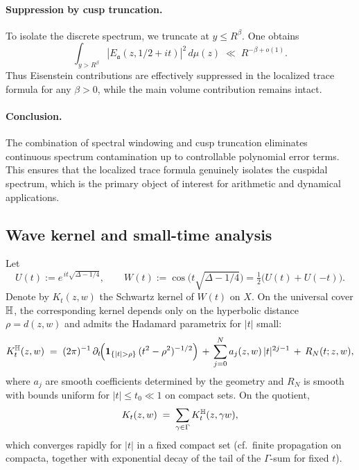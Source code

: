\paragraph{Suppression by cusp truncation.}
To isolate the discrete spectrum, we truncate at $y \leq R^\beta$.  
One obtains
\[
  \int_{y>R^\beta} |E_\mathfrak{a}(z,1/2+it)|^2 \, d\mu(z) \;\ll\; R^{-\beta+o(1)}.
\]
Thus Eisenstein contributions are effectively suppressed in the localized trace formula 
for any $\beta>0$, while the main volume contribution remains intact.  

\paragraph{Conclusion.}
The combination of spectral windowing and cusp truncation eliminates continuous spectrum 
contamination up to controllable polynomial error terms.  
This ensures that the localized trace formula genuinely isolates the cuspidal spectrum, 
which is the primary object of interest for arithmetic and dynamical applications.

\subsection{Wave kernel and small-time analysis}\label{subsec:wave}

Let
\begin{equation}\label{eq:wave-def}
  U(t) := e^{\,it\sqrt{\Delta-1/4}}, 
  \qquad 
  W(t) := \cos\!\big(t\sqrt{\Delta-1/4}\big) = \tfrac12\big(U(t)+U(-t)\big).
\end{equation}
Denote by $K_t(z,w)$ the Schwartz kernel of $W(t)$ on $X$. On the universal cover $\mathbb{H}$,
the corresponding kernel depends only on the hyperbolic distance $\rho=d(z,w)$ and admits
the Hadamard parametrix for $|t|$ small:
\begin{equation}\label{eq:hadamard}
  K_t^{\HH}(z,w) \;=\; (2\pi)^{-1}\,\partial_t\!\Big( \mathbf{1}_{\{|t|>\rho\}}\,(t^2-\rho^2)^{-1/2} \Big)
  \,+\, \sum_{j=0}^{N} a_j(z,w)\,|t|^{2j-1} \,+\, R_N(t;z,w),
\end{equation}
where $a_j$ are smooth coefficients determined by the geometry and
$R_N$ is smooth with bounds uniform for $|t|\le t_0\ll 1$ on compact sets. On the quotient,
\begin{equation}\label{eq:periodization}
  K_t(z,w) \;=\; \sum_{\gamma\in\Gamma} K_t^{\mathbb{H}}(z, \gamma w),
\end{equation}
which converges rapidly for $|t|$ in a fixed compact set (cf.\ finite propagation on compacta,
together with exponential decay of the tail of the $\Gamma$-sum for fixed $t$).

